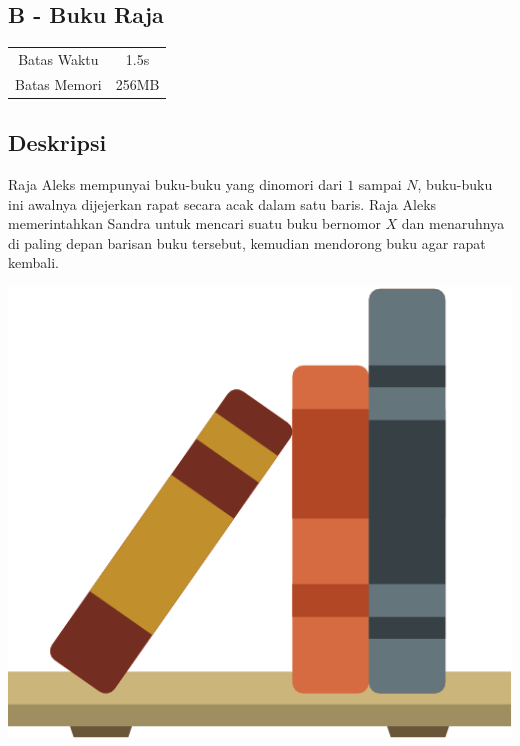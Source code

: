 \documentclass{article}
\begin{document}
\begin{center}
    \section*{B - Buku Raja} %

    \begin{tabular}{ | c c | }
        \hline
        Batas Waktu  & 1.5s \\    %
        Batas Memori & 256MB \\  %
        \hline
    \end{tabular}
\end{center}

\subsection*{Deskripsi}

Raja Aleks mempunyai buku-buku yang dinomori dari $1$ sampai $N$, buku-buku ini awalnya dijejerkan rapat secara acak dalam satu baris. Raja Aleks memerintahkan Sandra untuk mencari suatu buku bernomor $X$ dan menaruhnya di paling depan barisan buku tersebut, kemudian mendorong buku agar rapat kembali.

\begin{center}
\includegraphics[scale=0.3]{buku.png}
\end{center}
\end{document}
